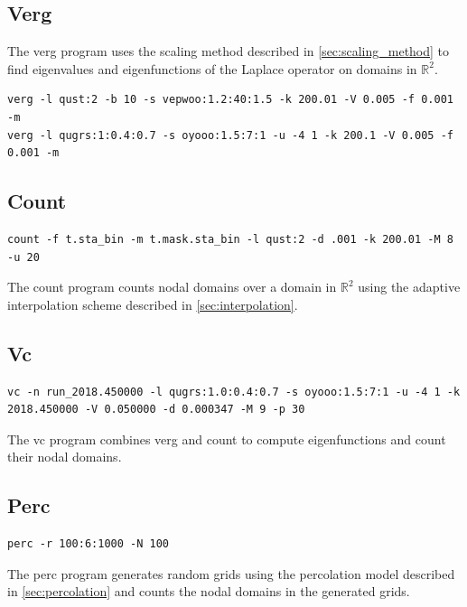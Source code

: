 \documentclass{report}
\begin{document}
\subsection{Verg}
The verg program uses the scaling method described in \ref{sec:scaling_method} to find eigenvalues and eigenfunctions of the Laplace operator on domains in $\mathbb{R}^{2}$.

\begin{verbatim}
verg -l qust:2 -b 10 -s vepwoo:1.2:40:1.5 -k 200.01 -V 0.005 -f 0.001 -m
verg -l qugrs:1:0.4:0.7 -s oyooo:1.5:7:1 -u -4 1 -k 200.1 -V 0.005 -f 0.001 -m
\end{verbatim}


\subsection{Count}
\begin{verbatim}
count -f t.sta_bin -m t.mask.sta_bin -l qust:2 -d .001 -k 200.01 -M 8 -u 20
\end{verbatim}
The count program counts nodal domains over a domain in $\mathbb{R}^{2}$ using the adaptive interpolation scheme described in \ref{sec:interpolation}.

\subsection{Vc}
\begin{verbatim}
vc -n run_2018.450000 -l qugrs:1.0:0.4:0.7 -s oyooo:1.5:7:1 -u -4 1 -k 2018.450000 -V 0.050000 -d 0.000347 -M 9 -p 30
\end{verbatim}
The vc program combines verg and count to compute eigenfunctions and count their nodal domains.

\subsection{Perc}
\begin{verbatim}
perc -r 100:6:1000 -N 100
\end{verbatim}
The perc program generates random grids using the percolation model described in \ref{sec:percolation} and counts the nodal domains in the generated grids.



\end{document}
